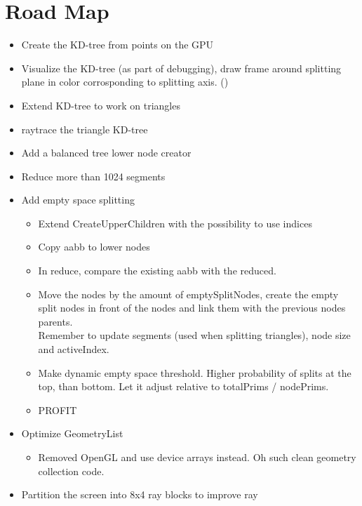 \newpage

\chapter{Road Map}

\begin{itemize}
\color{green}
\item Create the KD-tree from points on the GPU \checkmark
\item Visualize the KD-tree (as part of debugging), draw frame around
  splitting plane in color corrosponding to splitting axis. (\checkmark)
\item Extend KD-tree to work on triangles \checkmark
\item raytrace the triangle KD-tree \checkmark
\item Add a balanced tree lower node creator \checkmark
\item Reduce more than 1024 segments \checkmark
\item Add empty space splitting
  \begin{itemize}
    \item Extend CreateUpperChildren with the possibility to use indices \checkmark
    \item Copy aabb to lower nodes \checkmark
    \item In reduce, compare the existing aabb with the reduced. \checkmark
    \item Move the nodes by the amount of emptySplitNodes, create the
      empty split nodes in front of the nodes and link them with the
      previous nodes parents.\\ Remember to update segments (used when
      splitting triangles), node size and activeIndex. \checkmark
    \item \color{red}Make dynamic empty space threshold. Higher
      probability of splits at the top, than bottom. Let it adjust
      relative to totalPrims / nodePrims.
    \item PROFIT
  \end{itemize}
\item Optimize GeometryList
  \begin{itemize}
  \item Removed OpenGL and use device arrays instead. Oh such clean
    geometry collection code. \checkmark
  \end{itemize}
\item Partition the screen into 8x4 ray blocks to improve ray

\end{itemize}
